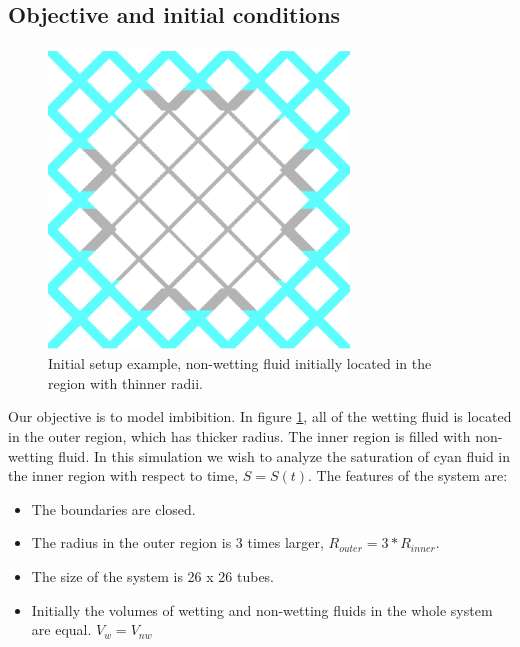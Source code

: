 \documentclass{crm-article}
\begin{document}
		\subsection{Objective and initial conditions} \label{sec:exp-init}
			\begin{figure}[H]
				\centering
				\includegraphics[height=8cm]{fig_result10by10_1}
				\caption{Initial setup example, non-wetting fluid initially located in the region with thinner radii.}
				\label{fig:invasion-result1}
			\end{figure}	
			
			Our objective is to model imbibition. In figure \ref{fig:invasion-result1}, all of the wetting fluid is located in the outer region, which has thicker radius. The inner region is filled with non-wetting fluid. In this simulation we wish to analyze the saturation of cyan fluid in the inner region with respect to time, $S = S(t)$. The features of the system are:
			
			\begin{itemize}
				\item The boundaries are closed.
				\item The radius in the outer region is 3 times larger, $R_{outer} = 3 * R_{inner}$.
				\item The size of the system is 26 x 26 tubes.
				\item Initially the volumes of wetting and non-wetting fluids in the whole system are equal. $V_{w} = V_{nw}$
			\end{itemize}
			
\end{document}
